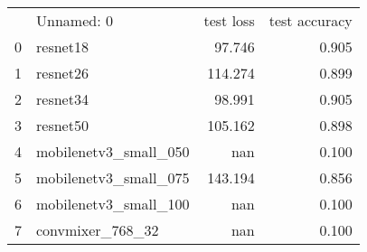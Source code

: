 \begin{tabular}{llrr}
 & Unnamed: 0 & test loss & test accuracy \\
0 & resnet18 & 97.746 & 0.905 \\
1 & resnet26 & 114.274 & 0.899 \\
2 & resnet34 & 98.991 & 0.905 \\
3 & resnet50 & 105.162 & 0.898 \\
4 & mobilenetv3_small_050 & nan & 0.100 \\
5 & mobilenetv3_small_075 & 143.194 & 0.856 \\
6 & mobilenetv3_small_100 & nan & 0.100 \\
7 & convmixer_768_32 & nan & 0.100 \\
\end{tabular}
